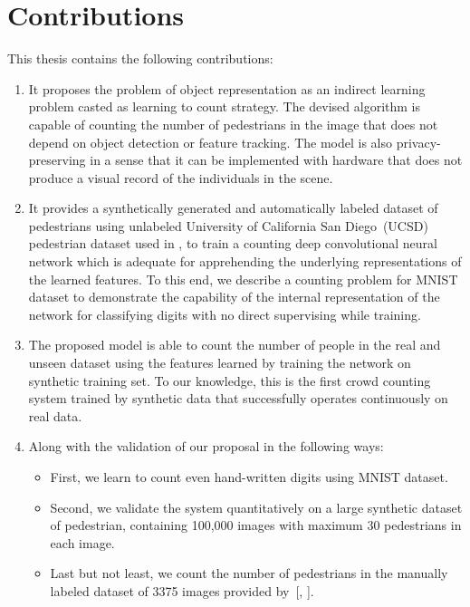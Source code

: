 \section{Contributions}
This thesis contains the following contributions:
\begin{enumerate}
	\item It proposes the problem of object representation as an indirect learning problem casted as learning to count strategy. The devised algorithm is capable of counting the number of pedestrians in the image that does not depend on object detection or feature tracking. The model is also privacy-preserving in a sense that it can be implemented with hardware that does not produce a visual record of the individuals in the scene. 
	\item It provides a synthetically generated and automatically labeled dataset of pedestrians using unlabeled University of California San Diego~(UCSD) pedestrian dataset used in \cite{mahadevan2010anomaly}, to train a counting deep convolutional neural network which is adequate for apprehending the underlying representations of the learned features. To this end, we describe a counting problem for MNIST dataset to demonstrate the capability of the internal representation of the network for classifying digits with no direct supervising while training. 
	\item The proposed model is able to count the number of people in the real and unseen dataset using the features learned by training the network on synthetic training set. To our knowledge, this is the first crowd counting system trained by synthetic data that successfully operates continuously on real data. 
	\item Along with the validation of our proposal in the following ways:
	\begin{itemize}
		\item First, we learn to count even hand-written digits using MNIST dataset. 
		\item Second, we validate the system quantitatively on a large synthetic dataset of pedestrian, containing 100,000 images with maximum 30 pedestrians in each image. 
		\item Last but not least, we count the number of pedestrians in the manually labeled dataset of 3375 images provided by~[\citeauthor*{chan2013ground}, \citeyear{chan2013ground}]. 
	\end{itemize}
	
\end{enumerate}

